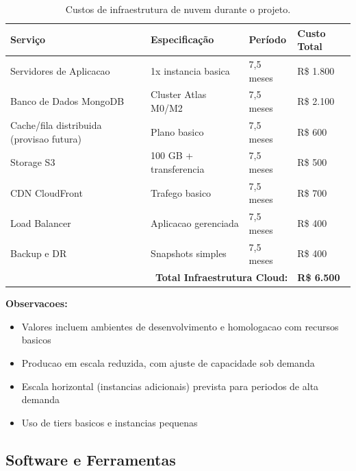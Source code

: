 \begin{table}[H]
\centering
\caption{Custos de infraestrutura de nuvem durante o projeto.}%
\label{tab:cloud}
\small
\begin{tabular}{|p{4cm}|p{3cm}|p{2cm}|p{3.5cm}|}
\hline
\textbf{Serviço} & \textbf{Especificação} & \textbf{Período} & \textbf{Custo Total} \\ \hline
Servidores de Aplicacao & 1x instancia basica & 7,5 meses & R\$ 1.800 \\ \hline
Banco de Dados MongoDB & Cluster Atlas M0/M2 & 7,5 meses & R\$ 2.100 \\ \hline
Cache/fila distribuida (provisao futura) & Plano basico & 7,5 meses & R\$ 600 \\ \hline
Storage S3 & 100 GB + transferencia & 7,5 meses & R\$ 500 \\ \hline
CDN CloudFront & Trafego basico & 7,5 meses & R\$ 700 \\ \hline
Load Balancer & Aplicacao gerenciada & 7,5 meses & R\$ 400 \\ \hline
Backup e DR & Snapshots simples & 7,5 meses & R\$ 400 \\ \hline
\multicolumn{3}{|r|}{\textbf{Total Infraestrutura Cloud:}} & \textbf{R\$ 6.500} \\ \hline
\end{tabular}
\end{table}

\textbf{Observacoes:}
\begin{itemize}
    \item Valores incluem ambientes de desenvolvimento e homologacao com recursos basicos
    \item Producao em escala reduzida, com ajuste de capacidade sob demanda
    \item Escala horizontal (instancias adicionais) prevista para periodos de alta demanda
    \item Uso de tiers basicos e instancias pequenas
\end{itemize}

\subsection{Software e Ferramentas}

